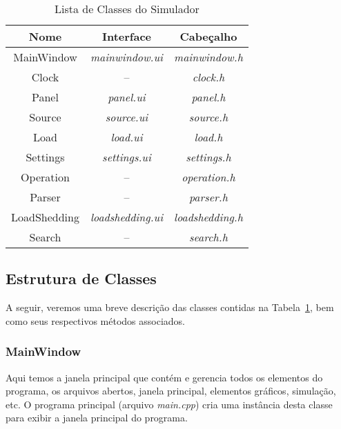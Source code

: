 \begin{table}[!h]
	\begin{center}
		\caption{Lista de Classes do Simulador}
		\label{tab:class}
	    \vspace{5pt}
		\begin{tabular}{c c c}
			\hline
			\textbf{Nome} & \textbf{Interface} & \textbf{Cabe{\c c}alho} \\
			\hline\hline
			MainWindow & \textit{mainwindow.ui} & \textit{mainwindow.h}\\
			Clock & \--- & \textit{clock.h} \\
			Panel & \textit{panel.ui} & \textit{panel.h} \\
			Source & \textit{source.ui} & \textit{source.h} \\
			Load & \textit{load.ui} & \textit{load.h} \\
			Settings & \textit{settings.ui} & \textit{settings.h} \\
			Operation & \--- & \textit{operation.h} \\
			Parser & \--- & \textit{parser.h} \\
			LoadShedding & \textit{loadshedding.ui} & \textit{loadshedding.h} \\
			Search & \--- & \textit{search.h} \\
			\hline
		\end{tabular}
	\end{center}
\end{table}

\subsection{Estrutura de Classes} \label{ssec:classes}

A seguir, veremos uma breve descri{\c c}{\~a}o das classes contidas na Tabela~\ref{tab:class}, bem como seus respectivos m{\'e}todos associados.

\subsubsection{MainWindow} \label{sssec:mainwindow}

Aqui temos a janela principal que cont{\'e}m e gerencia todos os elementos do programa, os arquivos abertos, janela principal, elementos gr{\'a}ficos, simula{\c c}{\~a}o, etc. O programa principal (arquivo \textit{main.cpp}) cria uma inst{\^a}ncia desta classe para exibir a janela principal do programa.

